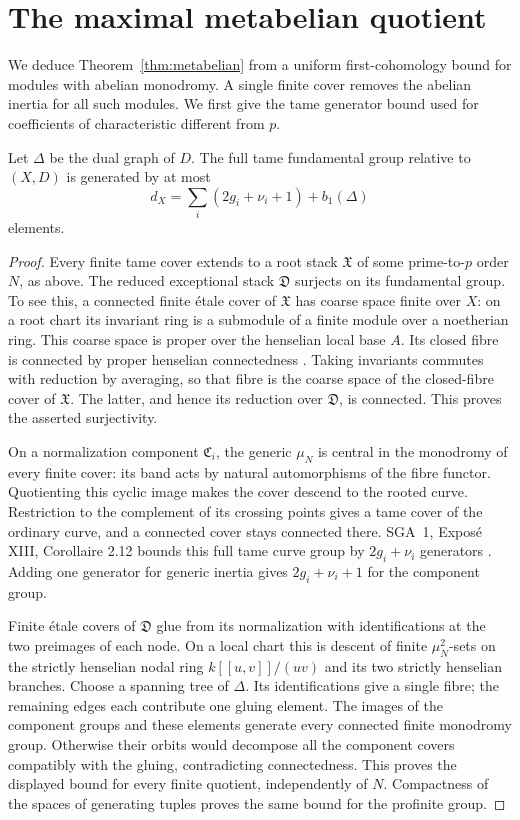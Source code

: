 \section{The maximal metabelian quotient}\label{sec:metabelian}

We deduce Theorem~\ref{thm:metabelian} from a uniform first-cohomology bound for modules with abelian monodromy. A single finite cover removes the abelian inertia for all such modules. We first give the tame generator bound used for coefficients of characteristic different from $p$.

\begin{lemma}\label{lem:tame-generators}
Let $\Delta$ be the dual graph of $D$. The full tame fundamental group relative to $(X,D)$ is generated by at most
\[
 d_X=\sum_i(2g_i+\nu_i+1)+b_1(\Delta)
\]
elements.
\end{lemma}
\begin{proof}
Every finite tame cover extends to a root stack $\mathfrak X$ of some prime-to-$p$ order $N$, as above. The reduced exceptional stack $\mathfrak D$ surjects on its fundamental group. To see this, a connected finite \'etale cover of $\mathfrak X$ has coarse space finite over $X$: on a root chart its invariant ring is a submodule of a finite module over a noetherian ring. This coarse space is proper over the henselian local base $A$. Its closed fibre is connected by proper henselian connectedness \cite[Tag 0A48]{Stacks}. Taking invariants commutes with reduction by averaging, so that fibre is the coarse space of the closed-fibre cover of $\mathfrak X$. The latter, and hence its reduction over $\mathfrak D$, is connected. This proves the asserted surjectivity.

On a normalization component $\mathfrak C_i$, the generic $\mu_N$ is central in the monodromy of every finite cover: its band acts by natural automorphisms of the fibre functor. Quotienting this cyclic image makes the cover descend to the rooted curve. Restriction to the complement of its crossing points gives a tame cover of the ordinary curve, and a connected cover stays connected there. SGA~1, Expos\'e XIII, Corollaire 2.12 bounds this full tame curve group by $2g_i+\nu_i$ generators \cite[original pp.~392--395; recomposed pp.~290--292]{SGA1}. Adding one generator for generic inertia gives $2g_i+\nu_i+1$ for the component group.

Finite \'etale covers of $\mathfrak D$ glue from its normalization with identifications at the two preimages of each node. On a local chart this is descent of finite $\mu_N^2$-sets on the strictly henselian nodal ring $k[[u,v]]/(uv)$ and its two strictly henselian branches. Choose a spanning tree of $\Delta$. Its identifications give a single fibre; the remaining edges each contribute one gluing element. The images of the component groups and these elements generate every connected finite monodromy group. Otherwise their orbits would decompose all the component covers compatibly with the gluing, contradicting connectedness. This proves the displayed bound for every finite quotient, independently of $N$. Compactness of the spaces of generating tuples proves the same bound for the profinite group.
\end{proof}

